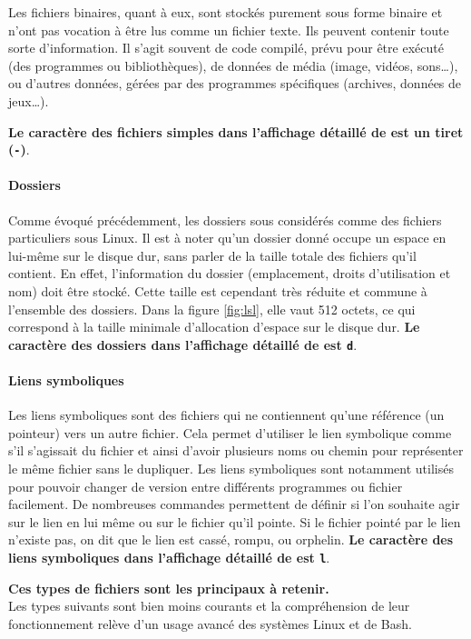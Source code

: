 Les fichiers binaires, quant à eux, sont stockés purement sous forme binaire et n'ont pas vocation à être lus comme un fichier texte. Ils peuvent contenir toute sorte d'information. Il s'agit souvent de code compilé, prévu pour être exécuté (des programmes ou bibliothèques), de données de média (image, vidéos, sons\dots), ou d'autres données, gérées par des programmes spécifiques (archives, données de jeux\dots).

\textbf{Le caractère des fichiers simples dans l'affichage détaillé de  est un tiret (\texttt{-})}.

\paragraph{Dossiers}
Comme évoqué précédemment, les dossiers sous considérés comme des fichiers particuliers sous Linux. Il est à noter qu'un dossier donné occupe un espace en lui-même sur le disque dur, sans parler de la taille totale des fichiers qu'il contient. En effet, l'information du dossier (emplacement, droits d'utilisation et nom) doit être stocké. Cette taille est cependant très réduite et commune à l'ensemble des dossiers. Dans la figure \ref{fig:lsl}, elle vaut 512 octets, ce qui correspond à la taille minimale d'allocation d'espace sur le disque dur.\newline 
\textbf{Le caractère des dossiers dans l'affichage détaillé de  est \texttt{d}}.

\paragraph{Liens symboliques} \label{sec:file_links}
Les liens symboliques sont des fichiers qui ne contiennent qu'une référence (un pointeur) vers un autre fichier. Cela permet d'utiliser le lien symbolique comme s'il s'agissait du fichier et ainsi d'avoir plusieurs noms ou chemin pour représenter le même fichier sans le dupliquer. Les liens symboliques sont notamment utilisés pour pouvoir changer de version entre différents programmes ou fichier facilement. De nombreuses commandes permettent de définir si l'on souhaite agir sur le lien en lui même ou sur le fichier qu'il pointe. Si le fichier pointé par le lien n'existe pas, on dit que le lien est cassé, rompu, ou orphelin. \newline
\textbf{Le caractère des liens symboliques dans l'affichage détaillé de  est \texttt{l}}.

\vspace{5mm}
\begin{nscenter}
\textbf{Ces types de fichiers sont les principaux à retenir.} \\
Les types suivants sont bien moins courants et la compréhension de leur fonctionnement relève d'un usage avancé des systèmes Linux et de Bash.
\end{nscenter}

